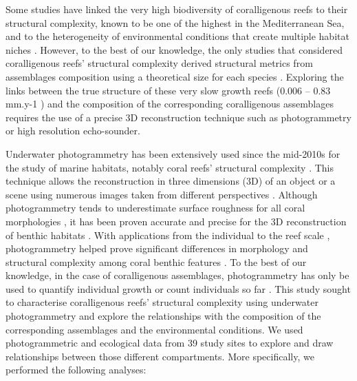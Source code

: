 Some studies have linked the very high biodiversity of coralligenous reefs to their structural complexity, known to be one of the highest in the Mediterranean Sea, and to the heterogeneity of environmental conditions that create multiple habitat niches \citep{johnson_area-independent_2003, kipson_rapid_2011, willis_habitat_2005}. However, to the best of our knowledge, the only studies that considered coralligenous reefs’ structural complexity derived structural metrics from assemblages composition using a theoretical size for each species \citep{sartoretto_integrated_2017, valisano_characterization_2019}. Exploring the links between the true structure of these very slow growth reefs (0.006 – 0.83 mm.y-1 \citep{sartoretto_age_1996}) and the composition of the corresponding coralligenous assemblages requires the use of a precise 3D reconstruction technique such as photogrammetry or high resolution echo-sounder.

Underwater photogrammetry has been extensively used since the mid-2010s for the study of marine habitats, notably coral reefs’ structural complexity \citep{bryson_characterization_2017, burns_integrating_2015, burns_utilizing_2015, figueira_accuracy_2015, gutierrez-heredia_simple_2015, leon_measuring_2015}. This technique allows the reconstruction in three dimensions (3D) of an object or a scene using numerous images taken from different perspectives \citep{figueira_accuracy_2015}. Although photogrammetry tends to underestimate surface roughness for all coral morphologies \citep{figueira_accuracy_2015}, it has been proven accurate and precise for the 3D reconstruction of benthic habitats \citep{bryson_characterization_2017, figueira_accuracy_2015, marre_monitoring_2019}. With applications from the individual \citep{zawada_quantifying_2019} to the reef scale  \citep{figueira_accuracy_2015}, photogrammetry helped prove significant differences in morphology and structural complexity among coral benthic features \citep{burns_integrating_2015}. To the best of our knowledge, in the case of coralligenous assemblages, photogrammetry has only be used to quantify individual growth or count individuals so far \citep{palma_sfm-based_2018,palma_effective_2019,royer_photogrammetric_2018}. This study sought to characterise coralligenous reefs’ structural complexity using underwater photogrammetry and explore the relationships with the composition of the corresponding assemblages and the environmental conditions. We used photogrammetric and ecological data from 39 study sites to explore and draw relationships between those different compartments. More specifically, we performed the following analyses:


